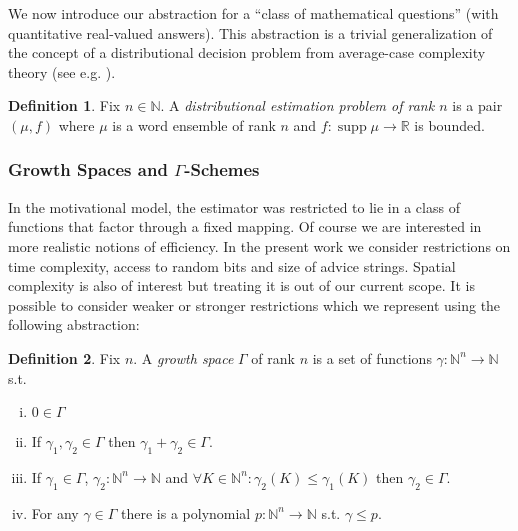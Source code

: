\documentclass{article}
\numberwithin{equation}{section}
\theoremstyle{definition}
\newtheorem{definition}{Definition}[section]
\theoremstyle{plain}
\DeclareMathOperator{\Supp}{supp}
\newcommand{\Nats}{\mathbb{N}}
\newcommand{\Reals}{\mathbb{R}}
\begin{document}
We now introduce our abstraction for a \enquote{class of mathematical questions} (with quantitative real-valued answers). This abstraction is a trivial generalization of the concept of a distributional decision problem from average-case complexity theory (see e.g. \cite{Bogdanov_2006}).

\begin{definition}

Fix ${n \in \Nats}$. A \emph{distributional estimation problem of rank ${n}$} is a pair $(\mu,f)$ where $\mu$ is a word ensemble of rank ${n}$ and $f: \Supp \mu \rightarrow \Reals$ is bounded.

\end{definition}

\subsubsection{Growth Spaces and \texorpdfstring{$\Gamma$}{Γ}-Schemes}

In the motivational model, the estimator was restricted to lie in a class of functions that factor through a fixed mapping. Of course we are interested in more realistic notions of efficiency. In the present work we consider restrictions on time complexity, access to random bits and size of advice strings. Spatial complexity is also of interest but treating it is out of our current scope. It is possible to consider weaker or stronger restrictions which we represent using the following abstraction:

\begin{samepage}
\begin{definition}

Fix $n$. A \emph{growth space} $\Gamma$ of rank $n$ is a set of functions ${\gamma: \Nats^n \rightarrow \Nats}$ s.t.

\begin{enumerate}[(i)]

\item $0 \in \Gamma$

\item If $\gamma_1, \gamma_2 \in \Gamma$ then $\gamma_1 + \gamma_2 \in \Gamma$.

\item If $\gamma_1 \in \Gamma$, $\gamma_2: \Nats^n \rightarrow \Nats$ and $\forall K \in \Nats^n: \gamma_2(K) \leq \gamma_1(K)$ then $\gamma_2 \in \Gamma$.

\item For any $\gamma \in \Gamma$ there is a polynomial $p: \Nats^n \rightarrow \Nats$ s.t. $\gamma \leq p$.

\end{enumerate}

\end{definition}
\end{samepage}
\end{document}
